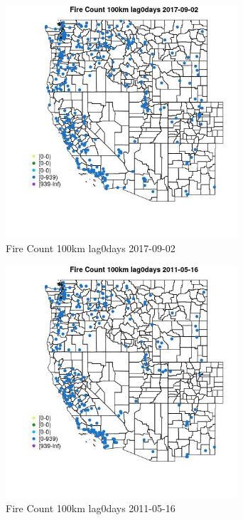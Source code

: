\begin{figure} 
\centering  
\includegraphics[width=0.77\textwidth]{Code_Outputs/Report_ML_input_PM25_Step4_part_e_de_duplicated_aves_compiled_2019-05-21wNAs_MapObsFire_Count_100km_lag0days2017-09-02.jpg} 
\caption{\label{fig:Report_ML_input_PM25_Step4_part_e_de_duplicated_aves_compiled_2019-05-21wNAsMapObsFire_Count_100km_lag0days2017-09-02}Fire Count 100km lag0days 2017-09-02} 
\end{figure} 
 

\begin{figure} 
\centering  
\includegraphics[width=0.77\textwidth]{Code_Outputs/Report_ML_input_PM25_Step4_part_e_de_duplicated_aves_compiled_2019-05-21wNAs_MapObsFire_Count_100km_lag0days2011-05-16.jpg} 
\caption{\label{fig:Report_ML_input_PM25_Step4_part_e_de_duplicated_aves_compiled_2019-05-21wNAsMapObsFire_Count_100km_lag0days2011-05-16}Fire Count 100km lag0days 2011-05-16} 
\end{figure} 
 

